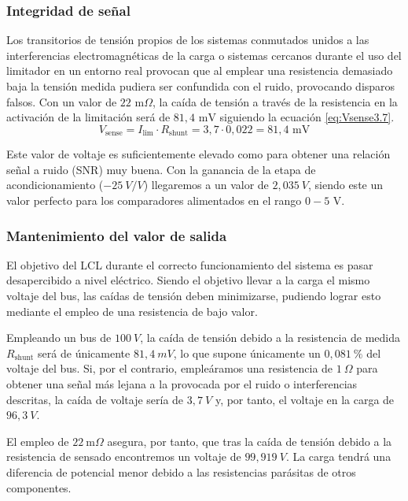 \documentclass[12pt]{report} %
\begin{document}
\subsubsection{Integridad de señal}
Los transitorios de tensión propios de los sistemas conmutados unidos a las interferencias electromagnéticas de la carga o sistemas cercanos durante el uso del limitador en un entorno real provocan que al emplear una resistencia demasiado baja la tensión medida pudiera ser confundida con el ruido, provocando disparos falsos. 
Con un valor de $22\text{ m}\Omega$, la caída de tensión a través de la resistencia en la activación de la limitación será de $81{,}4 \text{ mV}$ siguiendo la ecuación \ref{eq:Vsense3.7}.
\begin{equation}
    \label{eq:Vsense3.7}
    V_\text{sense} = I_\text{lim} \cdot R_\text{shunt} = 3{,}7 \cdot 0{,}022 = 81{,}4\text{ mV}
\end{equation}

Este valor de voltaje es suficientemente elevado como para obtener una relación señal a ruido (SNR) muy buena. Con la ganancia de la etapa de acondicionamiento ($-25~V/V $) llegaremos a un valor de $2{,}035~V$, siendo este un valor perfecto para los comparadores alimentados en el rango $0-5$ V. 

\subsubsection{Mantenimiento del valor de salida}
El objetivo del LCL durante el correcto funcionamiento del sistema es pasar desapercibido a nivel eléctrico. Siendo el objetivo llevar a la carga el mismo voltaje del bus, las caídas de tensión deben minimizarse, pudiendo lograr esto mediante el empleo de una resistencia de bajo valor. 

Empleando un bus de $100~V$, la caída de tensión debido a la resistencia de medida $R_\text{shunt}$ será de únicamente $81{,}4~mV$, lo que supone únicamente un $0{,}081~\%$ del voltaje del bus. Si, por el contrario, empleáramos una resistencia de $1~ \Omega$ para obtener una señal más lejana a la provocada por el ruido o interferencias descritas, la caída de voltaje sería de $3{,}7~V$ y, por tanto, el voltaje en la carga de $96{,}3~V$. 

El empleo de $22~\text{m}\Omega$ asegura, por tanto, que tras la caída de tensión debido a la resistencia de sensado encontremos un voltaje de $99{,}919~V$. La carga tendrá una diferencia de potencial menor debido a las resistencias parásitas de otros componentes.
\end{document}
